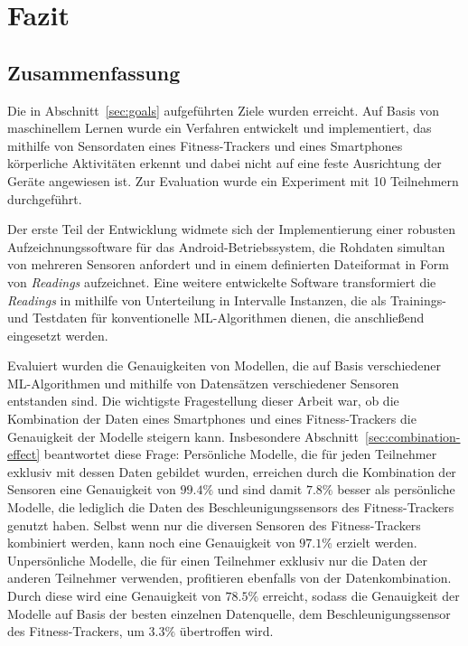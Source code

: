 \chapter{Fazit}
\label{chap:conclusions}

\section{Zusammenfassung}
Die in Abschnitt~\ref{sec:goals} aufgeführten Ziele wurden erreicht. Auf Basis von maschinellem Lernen wurde ein Verfahren entwickelt und implementiert, das mithilfe von Sensordaten eines Fitness-Trackers und eines Smartphones körperliche Aktivitäten erkennt und dabei nicht auf eine feste Ausrichtung der Geräte angewiesen ist. Zur Evaluation wurde ein Experiment mit 10 Teilnehmern durchgeführt.

Der erste Teil der Entwicklung widmete sich der Implementierung einer robusten Aufzeichnungssoftware für das Android-Betriebssystem, die Rohdaten simultan von mehreren Sensoren anfordert und in einem definierten Dateiformat in Form von \textit{Readings} aufzeichnet. Eine weitere entwickelte Software transformiert die \textit{Readings} in mithilfe von Unterteilung in Intervalle Instanzen, die als Trainings- und Testdaten für konventionelle ML-Algorithmen dienen, die anschließend eingesetzt werden.

Evaluiert wurden die Genauigkeiten von Modellen, die auf Basis verschiedener ML-Algorithmen und mithilfe von Datensätzen verschiedener Sensoren entstanden sind. Die wichtigste Fragestellung dieser Arbeit war, ob die Kombination der Daten eines Smartphones und eines Fitness-Trackers die Genauigkeit der Modelle steigern kann. Insbesondere Abschnitt~\ref{sec:combination-effect} beantwortet diese Frage: Persönliche Modelle, die für jeden Teilnehmer exklusiv mit dessen Daten gebildet wurden, erreichen durch die Kombination der Sensoren eine Genauigkeit von $99.4 \%$ und sind damit $7.8 \%$ besser als persönliche Modelle, die lediglich die Daten des Beschleunigungssensors des Fitness-Trackers genutzt haben. Selbst wenn nur die diversen Sensoren des Fitness-Trackers kombiniert werden, kann noch eine Genauigkeit von $97.1 \%$ erzielt werden. Unpersönliche Modelle, die für einen Teilnehmer exklusiv nur die Daten der anderen Teilnehmer verwenden, profitieren ebenfalls von der Datenkombination. Durch diese wird eine Genauigkeit von $78.5 \%$ erreicht, sodass die Genauigkeit der Modelle auf Basis der besten einzelnen Datenquelle, dem Beschleunigungssensor des Fitness-Trackers, um $3.3 \%$ übertroffen wird.

